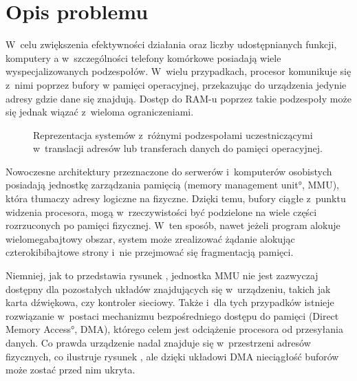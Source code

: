 \section{Opis problemu}

W~celu zwiększenia efektywności działania oraz liczby udostępnianych
funkcji, komputery a w~szczególności telefony komórkowe posiadają
wiele wyspecjalizowanych podzespołów.  W~wielu przypadkach, procesor
komunikuje się z~nimi poprzez bufory w pamięci operacyjnej,
przekazując do urządzenia jedynie adresy gdzie dane się znajdują.
Dostęp do RAM-u poprzez takie podzespoły może się jednak wiązać
z~wieloma ograniczeniami.

\begin{figure}[tbp]
  \centering
   \qquad
  \qquad
  \caption[Różne przestrzenie adresowe dostępne
    w~komputerze.]{Reprezentacja systemów z~różnymi podzespołami
    uczestniczącymi w~translacji adresów lub transferach danych do
    pamięci operacyjnej.}
  \label{fig:mmu-iommu}
\end{figure}

Nowoczesne architektury przeznaczone do serwerów i~komputerów
osobistych posiadają jednostkę zarządzania pamięcią (\ang{memory
  management unit}, MMU), która tłumaczy adresy logiczne na fizyczne.
Dzięki temu, bufory ciągłe z~punktu widzenia procesora, mogą
w~rzeczywistości być podzielone na wiele części rozrzuconych po
pamięci fizycznej.  W~ten sposób, nawet jeżeli program alokuje
wielomegabajtowy obszar, system może zrealizować żądanie alokując
czterokibibajtowe strony i~nie przejmować się fragmentacją pamięci.

Niemniej, jak to przedstawia rysunek ,
jednostka MMU nie jest zazwyczaj dostępny dla pozostałych układów
znajdujących się w~urządzeniu, takich jak karta dźwiękowa, czy
kontroler sieciowy.  Także i~dla tych przypadków istnieje rozwiązanie
w~postaci mechanizmu bezpośredniego dostępu do pamięci (\ang{Direct
  Memory Access}, DMA), którego celem jest odciążenie procesora od
przesyłania danych.  Co prawda urządzenie nadal znajduje się
w~przestrzeni adresów fizycznych, co ilustruje rysunek
, ale dzięki układowi DMA nieciągłość
buforów może zostać przed nim ukryta.

